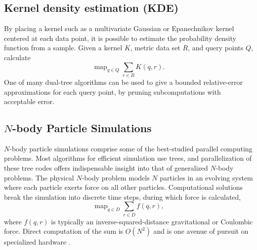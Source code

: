 \documentclass[twoside,leqno,twocolumn]{article}
\DeclareMathOperator*{\map}{map}
\DeclareMathOperator*{\argmin}{argmin}
\newcommand{\mysub}[1]{\subsection{#1} }
\newcommand{\ocpos}[1]{c^{+}_{#1}}
\newcommand{\cpos}[2]{\ocpos{#1 \neq #2}}
\newcommand{\simil}[2]{S_{#1#2}}
\newcommand{\vecrho}{\vec{\rho}}
\newcommand{\vecalpha}{\vec{\alpha}}
\newcommand{\frho}[1]{\rho_{#1}}
\newcommand{\falpha}[1]{\alpha_{#1}}
\newcommand{\falphaj}[2]{\alpha_{#1[#2]}}
\begin{document}
\mysub{Kernel density estimation (KDE)}
By placing a kernel such as a multivariate Gaussian or Epanechnikov kernel centered at each data point, it is possible to estimate the probability density function from a sample.
Given a kernel $K$, metric data set $R$, and query points $Q$, calculate
\[\map_{q \in Q} \sum_{r \in R} K(q, r).\]
One of many dual-tree algorithms \cite{gray_kde, lee_gauss1, lee_gauss2} can be used to give a bounded relative-error approximations for each query point, by pruning subcomputations with acceptable error.



\mysub{$N$-body Particle Simulations}

$N$-body particle simulations comprise some of the best-studied parallel computing problems.
Most algorithms for efficient simulation use trees, and parallelization of these tree codes offers indispensable insight into that of generalized $N$-body problems.
The physical $N$-body problem models $N$ particles in an evolving system where each particle exerts force on all other particles.
Computational solutions break the simulation into discrete time steps, during which force is calculated,
\[\map_{q \in D} \sum_{r \in D} f(q,r),\]
\noindent where $f(q,r)$ is typically an inverse-squared-distance gravitational or Coulombic force.
Direct computation of the sum is $O(N^2)$ and is one avenue of pursuit on specialized hardware \cite{grape}.
\end{document}
